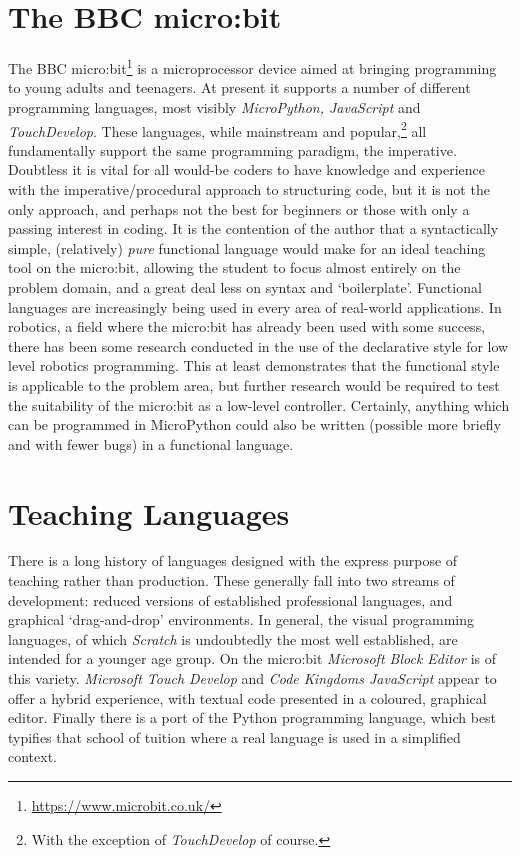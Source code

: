 \documentclass[12pt, a4paper]{report}
\begin{document}
\section{The BBC micro:bit} The BBC micro:bit\footnote{\url{https://www.microbit.co.uk/}} is a
microprocessor device aimed at bringing programming to young adults and teenagers. At present it
supports a number of different programming languages, most visibly \textit{MicroPython, JavaScript}
and \textit{TouchDevelop}. These languages, while mainstream and popular,\footnote{With the
exception of \textit{TouchDevelop} of course.} all fundamentally support the same programming
paradigm, the imperative. Doubtless it is vital for all would-be coders to have knowledge and
experience with the imperative/procedural approach to structuring code, but it is not the only
approach, and perhaps not the best for beginners or those with only a passing interest in coding.
It is the contention of the author that a syntactically simple, (relatively) \textit{pure}
functional language would make for an ideal teaching tool on the micro:bit, allowing the
student to focus almost entirely on the problem domain, and a great deal less on syntax and
`boilerplate'. Functional languages are increasingly being used in every area of real-world
applications. In robotics, a field where the micro:bit has already been used with some success,
there has been some research conducted in the use of the declarative style for low level robotics
programming\cite{frob}. This at least demonstrates that the functional style is applicable to the
problem area, but further research would be required to test the suitability of the micro:bit as
a low-level controller. Certainly, anything which can be programmed in MicroPython could also be
written (possible more briefly and with fewer bugs) in a functional language.

\section{Teaching Languages}
There is a long history of languages designed with the express purpose of teaching rather than
production. These generally fall into two streams of development: reduced versions of established
professional languages, and graphical `drag-and-drop' environments. In general, the visual
programming languages, of which \textit{Scratch} is undoubtedly the most well established, are
intended for a younger age group. On the micro:bit \textit{Microsoft Block Editor} is of this
variety. \textit{Microsoft Touch Develop} and \textit{Code Kingdoms JavaScript} appear to offer a
hybrid experience, with textual code presented in a coloured, graphical editor. Finally there is a
port of the Python programming language, which best typifies that school of tuition where a real
language is used in a simplified context.
\end{document}
